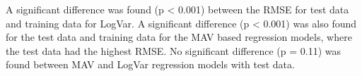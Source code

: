 \begin{multicols}{2}
	
	
	
	A significant difference was found (p < 0.001) between the RMSE for test data and training data for LogVar. A significant difference (p < 0.001) was also found for the test data and training data for the MAV based regression models, where the test data had the highest RMSE. No significant difference (p = 0.11) was found between MAV and LogVar regression models with test data.
	
\end{multicols}
	
